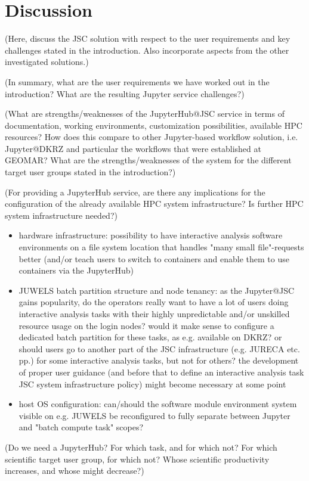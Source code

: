 \section{Discussion}

(Here, discuss the JSC solution with respect to the user requirements and key challenges stated in the introduction. Also incorporate aspects from the other investigated solutions.)

(In summary, what are the user requirements we have worked out in the introduction? What are the resulting Jupyter service challenges?)

(What are strengths/weaknesses of the JupyterHub@JSC service in terms of documentation, working environments, customization possibilities, available HPC resources? How does this compare to other Jupyter-based workflow solution, i.e. Jupyter@DKRZ and particular the workflows that were established at GEOMAR? What are the strengths/weaknesses of the system for the different target user groups stated in the introduction?)

(For providing a JupyterHub service, are there any implications for the configuration of the already available HPC system infrastructure? Is further HPC system infrastructure needed?)

\begin{itemize}
  \item hardware infrastructure: possibility to have interactive analysis software environments on a file system location that handles "many small file"-requests better (and/or teach users to switch to containers and enable them to use containers via the JupyterHub)
  \item JUWELS batch partition structure and node tenancy: as the Jupyter@JSC gains popularity, do the operators really want to have a lot of users doing interactive analysis tasks with their highly unpredictable and/or unskilled resource usage on the login nodes? would it make sense to configure a dedicated batch partition for these tasks, as e.g. available on DKRZ? or should users go to another part of the JSC infrastructure (e.g. JURECA etc. pp.) for some interactive analysis tasks, but not for others? the development of proper user guidance (and before that to define an interactive analysis task JSC system infrastructure policy) might become necessary at some point
  \item host OS configuration: can/should the software module environment system visible on e.g. JUWELS be reconfigured to fully separate between Jupyter and "batch compute task" scopes?
\end{itemize}

(Do we need a JupyterHub? For which task, and for which not? For which scientific target user group, for which not? Whose scientific productivity increases, and whose might decrease?)
